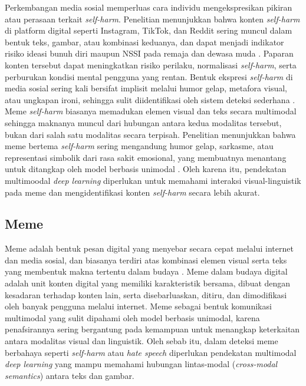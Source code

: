 Perkembangan media sosial memperluas cara individu mengekspresikan pikiran atau perasaan terkait \textit{self-harm}. Penelitian menunjukkan bahwa konten \textit{self-harm} di platform digital seperti Instagram, TikTok, dan Reddit sering muncul dalam bentuk teks, gambar, atau kombinasi keduanya, dan dapat menjadi indikator risiko ideasi bunuh diri maupun NSSI pada remaja dan dewasa muda \cite{arendt2019effects}. Paparan konten tersebut dapat meningkatkan risiko perilaku, normalisasi \textit{self-harm}, serta perburukan kondisi mental pengguna yang rentan. Bentuk ekspresi \textit{self-harm} di media sosial sering kali bersifat implisit melalui humor gelap, metafora visual, atau ungkapan ironi, sehingga sulit diidentifikasi oleh sistem deteksi sederhana \cite{Sharma2022HarmfulMemes}.
Meme \textit{self-harm} biasanya memadukan elemen visual dan teks secara multimodal sehingga maknanya muncul dari hubungan antara kedua modalitas tersebut, bukan dari salah satu modalitas secara terpisah. Penelitian menunjukkan bahwa meme bertema \textit{self-harm} sering mengandung humor gelap, sarkasme, atau representasi simbolik dari rasa sakit emosional, yang membuatnya menantang untuk ditangkap oleh model berbasis unimodal \cite{kiela2020hateful}. Oleh karena itu, pendekatan  multimoodal \textit{deep learning} diperlukan untuk memahami interaksi visual-linguistik pada meme dan mengidentifikasi konten \textit{self-harm} secara lebih akurat.

\subsection{Meme} \label{II.teori9}
Meme adalah bentuk pesan digital yang menyebar secara cepat melalui internet dan media sosial, dan biasanya terdiri atas kombinasi elemen visual serta teks yang membentuk makna tertentu dalam budaya \cite{shifman2013memes}. Meme dalam budaya digital adalah unit konten digital yang memiliki karakteristik bersama, dibuat dengan kesadaran terhadap konten lain, serta disebarluaskan, ditiru, dan dimodifikasi oleh banyak pengguna melalui internet.  Meme sebagai bentuk komunikasi multimodal yang sulit dipahami oleh model berbasis unimodal, karena penafsirannya sering bergantung pada kemampuan untuk menangkap keterkaitan antara modalitas visual dan linguistik. Oleh sebab itu, dalam deteksi meme berbahaya seperti \textit{self-harm} atau \textit{hate speech} diperlukan pendekatan multimodal \textit{deep learning} yang mampu memahami hubungan lintas-modal (\textit{cross-modal semantics}) antara teks dan gambar.


